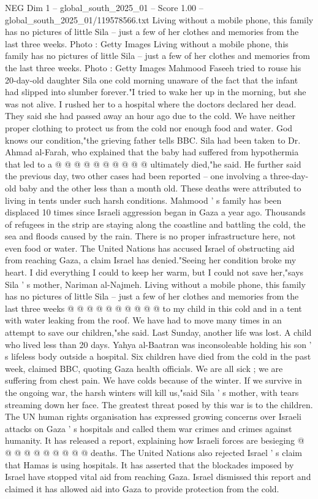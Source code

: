 \begin{textsample}{NEG Dim 1 – global\_south\_2025\_01 – Score 1.00 – global\_south\_2025\_01/119578566.txt}  \label{ex:f1_neg_151}
Living without a mobile phone, this family has no pictures of little Sila -- just a few of her clothes and memories from the last three weeks.
Photo : Getty Images Living without a mobile phone, this family has no pictures of little Sila -- just a few of her clothes and memories from the last three weeks.
Photo : Getty Images Mahmood Faseeh tried to rouse his 20-day-old daughter Sila one cold morning unaware of the fact that the infant had slipped into slumber forever."I tried to wake her up in the morning, but she was not alive.
I rushed her to a hospital where the doctors declared her dead.
They said she had passed away an hour ago due to the cold.
We have neither proper clothing to protect us from the cold nor enough food and water.
God knows our condition,"the grieving father tells BBC.
Sila had been taken to Dr.
Ahmad al-Farah, who explained that the baby had suffered from hypothermia that led to a @ @ @ @ @ @ @ @ @ @ ultimately died,"he said.
He further said the previous day, two other cases had been reported -- one involving a three-day-old baby and the other less than a month old.
These deaths were attributed to living in tents under such harsh conditions.
Mahmood ' s family has been displaced 10 times since Israeli aggression began in Gaza a year ago.
Thousands of refugees in the strip are staying along the coastline and battling the cold, the sea and floods caused by the rain.
There is no proper infrastructure here, not even food or water.
The United Nations has accused Israel of obstructing aid from reaching Gaza, a claim Israel has denied."Seeing her condition broke my heart.
I did everything I could to keep her warm, but I could not save her,"says Sila ' s mother, Nariman al-Najmeh.
Living without a mobile phone, this family has no pictures of little Sila -- just a few of her clothes and memories from the last three weeks @ @ @ @ @ @ @ @ @ @ to my child in this cold and in a tent with water leaking from the roof.
We have had to move many times in an attempt to save our children,"she said.
Last Sunday, another life was lost.
A child who lived less than 20 days.
Yahya al-Baatran was inconsoleable holding his son ' s lifeless body outside a hospital.
Six children have died from the cold in the past week, claimed BBC, quoting Gaza health officials.
We are all sick ; we are suffering from chest pain.
We have colds because of the winter.
If we survive in the ongoing war, the harsh winters will kill us,"said Sila ' s mother, with tears streaming down her face.
The greatest threat posed by this war is to the children.
The UN human rights organisation has expressed growing concerns over Israeli attacks on Gaza ' s hospitals and called them war crimes and crimes against humanity.
It has released a report, explaining how Israeli forces are besieging @ @ @ @ @ @ @ @ @ @ deaths.
The United Nations also rejected Israel ' s claim that Hamas is using hospitals.
It has asserted that the blockades imposed by Israel have stopped vital aid from reaching Gaza.
Israel dismissed this report and claimed it has allowed aid into Gaza to provide protection from the cold.

\end{textsample}
